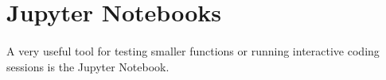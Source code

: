 \section{Jupyter Notebooks}
\paragraph{}A very useful tool for testing smaller functions or running interactive coding sessions is the Jupyter Notebook.